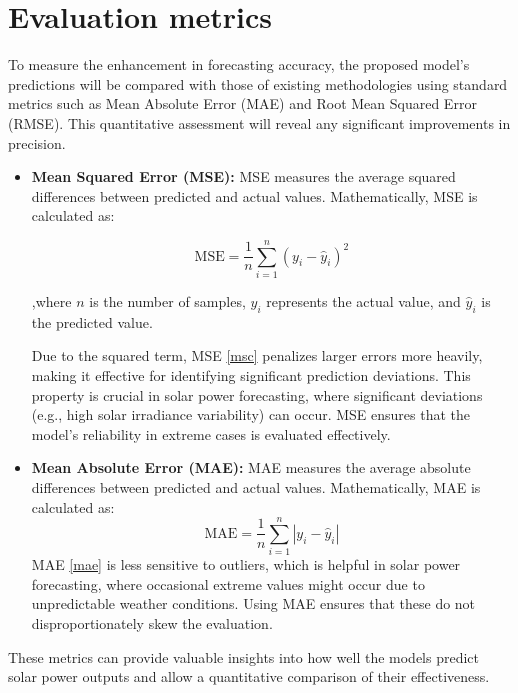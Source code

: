 \documentclass[12pt]{uomthesis}
\begin{document}
\section{Evaluation metrics}
To measure the enhancement in forecasting accuracy, the proposed model's predictions will be compared with those of existing methodologies using standard metrics such as Mean Absolute Error (MAE) and Root Mean Squared Error (RMSE). This quantitative assessment will reveal any significant improvements in precision.

\begin{itemize}
    \item \textbf{Mean Squared Error (MSE):} MSE measures the average squared differences between predicted and actual values. Mathematically, MSE is calculated as:

\begin{equation}
\text{MSE} = \frac{1}{n} \sum_{i=1}^{n} (y_i - \hat{y}_i)^2
\label{msc}
\end{equation}

,where \( n \) is the number of samples, \( y_i \) represents the actual value, and \( \hat{y}_i \) is the predicted value.

Due to the squared term, MSE \eqref{msc} penalizes larger errors more heavily, making it effective for identifying significant prediction deviations. This property is crucial in solar power forecasting, where significant deviations (e.g., high solar irradiance variability) can occur. MSE ensures that the model's reliability in extreme cases is evaluated effectively.

    
\item \textbf{Mean Absolute Error (MAE):} MAE  measures the average absolute differences between predicted and actual values. Mathematically, MAE is calculated as:
\begin{equation}
\text{MAE} = \frac{1}{n} \sum_{i=1}^{n} |y_i - \hat{y}_i|
\label{mae}
\end{equation}
MAE \eqref{mae} is less sensitive to outliers, which is helpful in solar power forecasting, where occasional extreme values might occur due to unpredictable weather conditions. Using MAE ensures that these do not disproportionately skew the evaluation.

\end{itemize}
These metrics can provide valuable insights into how well the models predict solar power outputs and allow a quantitative comparison of their effectiveness.
\end{document}
